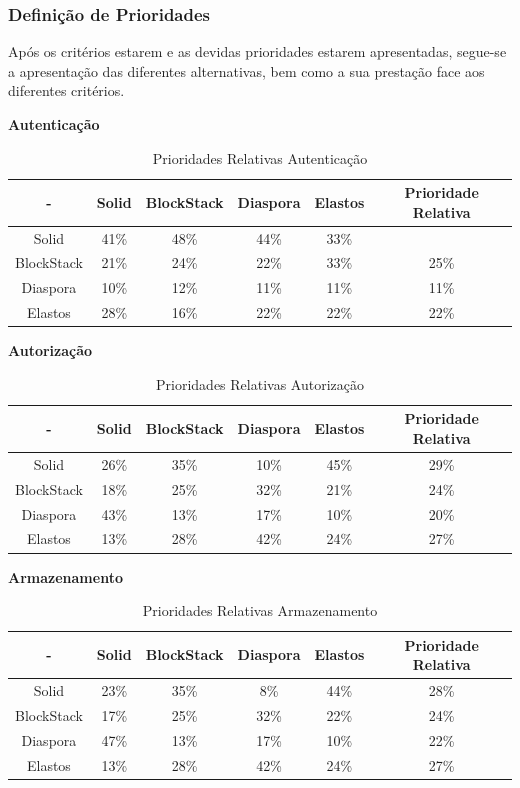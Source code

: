 \pagebreak

\subsubsection{Definição de Prioridades}
Após os critérios estarem e as devidas prioridades estarem apresentadas, segue-se a apresentação das diferentes alternativas, bem como a sua prestação face aos diferentes critérios.

\textbf{Autenticação}

\begin{table}[h]
\centering
\caption{Prioridades Relativas Autenticação}
\vspace{0.5cm}
\begin{tabular}{c|c|c|c|c|c} 
 - & Solid & BlockStack & Diaspora & Elastos & Prioridade Relativa \\
\hline                               
Solid & 41\% &	48\% &	44\% & 33\% \\
BlockStack &  21\% & 24\% &	22\% &	33\% &	25\% \\
Diaspora &  10\% &	12\% &	11\% & 11\%	& 11\% \\
Elastos & 28\% & 16\% & 22\% & 22\% & 22\% \\
\end{tabular}
\end{table}

\textbf{Autorização}

\begin{table}[h]
\centering
\caption{Prioridades Relativas Autorização}
\vspace{0.5cm}
\begin{tabular}{c|c|c|c|c|c} 
 - & Solid & BlockStack & Diaspora & Elastos & Prioridade Relativa \\
\hline                               
Solid & 26\% &	35\% &	10\% & 45\% & 29\% \\
BlockStack &  18\% & 25\% & 32\% & 21\% & 24\% \\
Diaspora &  43\% &	13\% &	17\% &	10\% & 20\% \\
Elastos & 13\% & 28\% &	42\% & 24\% & 27\% \\
\end{tabular}
\end{table}

\pagebreak

\textbf{Armazenamento}

\begin{table}[h]
\centering
\caption{Prioridades Relativas Armazenamento}
\vspace{0.5cm}
\begin{tabular}{c|c|c|c|c|c} 
 - & Solid & BlockStack & Diaspora & Elastos & Prioridade Relativa \\
\hline                               
Solid & 23\% & 35\% & 8\% & 44\% & 28\% \\
BlockStack &  17\% & 25\%	& 32\%	& 22\%	& 24\% \\
Diaspora &  47\% &	13\% & 17\%	& 10\% & 22\% \\
Elastos & 13\% & 28\% & 42\% & 24\% & 27\% \\
\end{tabular}
\end{table}

